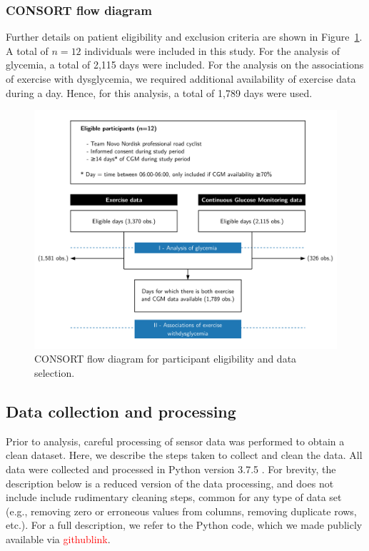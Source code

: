 \documentclass[11pt,a4paper]{article}
\newcommand\TODO[1]{\textcolor{red}{#1}}
\begin{document}
\subsubsection{CONSORT flow diagram}
Further details on patient eligibility and exclusion criteria are shown in Figure~\ref{fig:consort}. A total of $n=12$ individuals were included in this study. For the analysis of glycemia, a total of 2,115 days were included. For the analysis on the associations of exercise with dysglycemia, we required additional availability of exercise data during a day. Hence, for this analysis, a total of 1,789 days were used.

\begin{figure}[h!]
    \vspace{2cm}
    \centering
    \caption[CONSORT flow diagram]{CONSORT flow diagram for participant eligibility and data selection.}
    \label{fig:consort}
    \includegraphics[width=\textwidth, trim=1.9cm 0cm 1.8cm 0cm, clip]{figure/CONSORT_v4.pdf}
\end{figure}

\newpage

\subsection{Data collection and processing}
Prior to analysis, careful processing of sensor data was performed to obtain a clean dataset. Here, we describe the steps taken to collect and clean the data. All data were collected and processed in Python version 3.7.5 \cite{python}. For brevity, the description below is a reduced version of the data processing, and does not include include rudimentary cleaning steps, common for any type of data set (e.g., removing zero or erroneous values from columns, removing duplicate rows, etc.). For a full description, we refer to the Python code, which we made publicly available via \TODO{githublink}.
\end{document}
